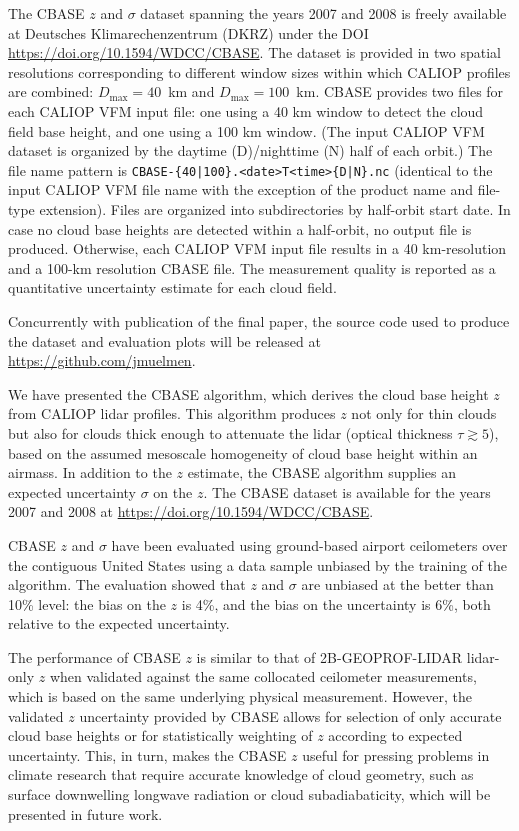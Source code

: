 \documentclass[essd,manuscript]{copernicus}\usepackage[]{graphicx}\usepackage[]{color}
\newcommand\CBH{\ensuremath{z}}
\begin{document}
The CBASE \CBH{} and $\sigma$ dataset \citep{cbase} spanning the years 2007 and
2008 is freely available at Deutsches Klimarechenzentrum (DKRZ) under the DOI
\url{https://doi.org/10.1594/WDCC/CBASE}.  The dataset is provided in two
spatial resolutions corresponding to different window sizes within which CALIOP
profiles are combined: $D_\text{max} = 40$~\unit{km} and
$D_\text{max} = 100$~\unit{km}.  CBASE provides two files for each CALIOP VFM
input file: one using a 40 km window to detect the cloud field base height, and
one using a 100 km window. (The input CALIOP VFM dataset is organized by the
daytime (D)/nighttime (N) half of each orbit.) The file name pattern is
\verb+CBASE-{40|100}.<date>T<time>{D|N}.nc+ (identical to the input CALIOP VFM
file name with the exception of the product name and file-type extension). Files
are organized into subdirectories by half-orbit start date.  In case no cloud
base heights are detected within a half-orbit, no output file is
produced. Otherwise, each CALIOP VFM input file results in a 40 km-resolution
and a 100-km resolution CBASE file. The measurement quality is reported as a
quantitative uncertainty estimate for each cloud field.

Concurrently with publication of the final paper, the
source code used to produce the dataset and evaluation plots will be released
at \url{https://github.com/jmuelmen}.

\conclusions
\label{sec:conclusions}

We have presented the CBASE algorithm, which derives the cloud base height \CBH{} from CALIOP lidar
profiles.  This algorithm produces \CBH{} not only for thin clouds but also for
clouds thick enough to attenuate the lidar (optical thickness $\tau \gtrsim 5$),
based on the assumed mesoscale homogeneity of cloud base height within an
airmass.  In addition to the \CBH{} estimate, the CBASE algorithm supplies an
expected uncertainty $\sigma$ on the \CBH{}.  The CBASE dataset is available for the years 2007
and 2008 at \url{https://doi.org/10.1594/WDCC/CBASE}.

CBASE \CBH{} and $\sigma$ have been evaluated using
ground-based airport ceilometers over the contiguous United States using a
data sample unbiased by the training of the algorithm.  The evaluation showed that
\CBH{} and $\sigma$ are unbiased at the better
than 10\% level: the bias on the \CBH{} is %
4\%,
and the bias on the uncertainty is %
6\%, both relative to the expected uncertainty.

The performance of CBASE \CBH{} is similar to that of 2B-GEOPROF-LIDAR
lidar-only \CBH{} when validated against the same collocated ceilometer measurements, which is based on the same underlying physical measurement.
However, the validated \CBH{} uncertainty provided by CBASE allows for selection
of only accurate cloud base heights or for statistically weighting of \CBH{}
according to expected uncertainty.  This, in turn, makes the CBASE \CBH{} useful
for pressing problems in climate research that require accurate knowledge of
cloud geometry, such as surface downwelling longwave radiation or cloud
subadiabaticity, which will be presented in future work.
\end{document}
